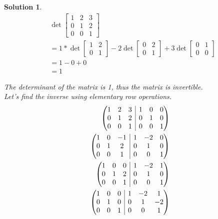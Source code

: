 \documentclass{article}
\newtheorem*{solution}{Solution}
\begin{document}
\begin{solution}
\begin{align*}
& \det \begin{bmatrix}
1 & 2 & 3 \\ 0 & 1 & 2 \\ 0 & 0 & 1
\end{bmatrix} \\
&= 1 * \det \begin{bmatrix}1 & 2 \\ 0 & 1\end{bmatrix} - 2 \det \begin{bmatrix}0 & 2 \\ 0 & 1\end{bmatrix} + 3 \det \begin{bmatrix}0 & 1 \\ 0 & 0\end{bmatrix} \\
&= 1 - 0 + 0 \\
&= 1
\end{align*}

The determinant of the matrix is 1, thus the matrix is invertible. \\

Let's find the inverse using elementary row operations. \\

\begin{align*}
\left( \begin{array}{@{}ccc|ccc@{}}
1 & 2 & 3 & 1 & 0 & 0 \\ 0 & 1 & 2 & 0 & 1 & 0 \\ 0 & 0 & 1 & 0 & 0 & 1
\end{array} \right) \\
\left( \begin{array}{@{}ccc|ccc@{}}
1 & 0 & -1 & 1 & -2 & 0 \\ 0 & 1 & 2 & 0 & 1 & 0 \\ 0 & 0 & 1 & 0 & 0 & 1
\end{array} \right) \\
\left( \begin{array}{@{}ccc|ccc@{}}
1 & 0 & 0 & 1 & -2 & 1 \\ 0 & 1 & 2 & 0 & 1 & 0 \\ 0 & 0 & 1 & 0 & 0 & 1
\end{array} \right) \\
\left( \begin{array}{@{}ccc|ccc@{}}
1 & 0 & 0 & 1 & -2 & 1 \\ 0 & 1 & 0 & 0 & 1 & -2 \\ 0 & 0 & 1 & 0 & 0 & 1
\end{array} \right)
\end{align*}


\end{solution}
\end{document}
